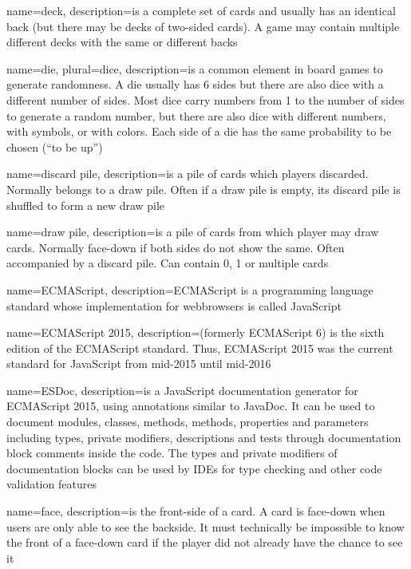 
{
  name=deck,
  description={is a complete set of cards and usually has an identical
  back (but there may be decks of two-sided cards). A game may contain
  multiple different decks with the same or different backs}
}

{
  name=die,
  plural=dice,
  description={is a common element in board games to generate randomness. A die
  usually has 6 sides but there are also dice with a different number of sides.
  Most dice carry numbers from 1 to the number of sides to generate a random
  number, but there are also dice with different numbers, with symbols, or with
  colors. Each side of a die has the same probability to be chosen (“to be
  up”)}
}

{
  name=discard pile,
  description={is a pile of cards which players discarded. Normally belongs to
  a draw pile. Often if a draw pile is empty, its discard pile is shuffled to
  form a new draw pile}
}

{
  name=draw pile,
  description={is a pile of cards from which player may draw cards. Normally
  face-down if both sides do not show the same. Often accompanied by a
  discard pile. Can contain 0, 1 or multiple cards}
}

{
  name=ECMAScript,
  description={ECMAScript is a programming language standard whose
  implementation for webbrowsers is called JavaScript}
}


{
  name={ECMAScript 2015},
  description={(formerly ECMAScript 6) is the sixth edition of the
  \gls{ECMAScript} standard. Thus, ECMAScript 2015 was the current standard for
  JavaScript from mid-2015 until mid-2016}
}


{
  name={ESDoc},
  description={is a JavaScript documentation generator for \gls{ECMAScript
  2015}, using annotations similar to JavaDoc. It can be used to document
  modules, classes, methods, methods, properties and parameters including
  types, private modifiers, descriptions and tests through documentation block
  comments inside the code. The types and private modifiers of documentation
  blocks can be used by \glspl{IDE} for type checking and other code validation
  features}
}

{
  name=face,
  description={is the front-side of a card. A card is face-down when users
  are only able to see the backside. It must technically be impossible to know
  the front of a face-down card if the player did not already have the chance
  to see it}
}

